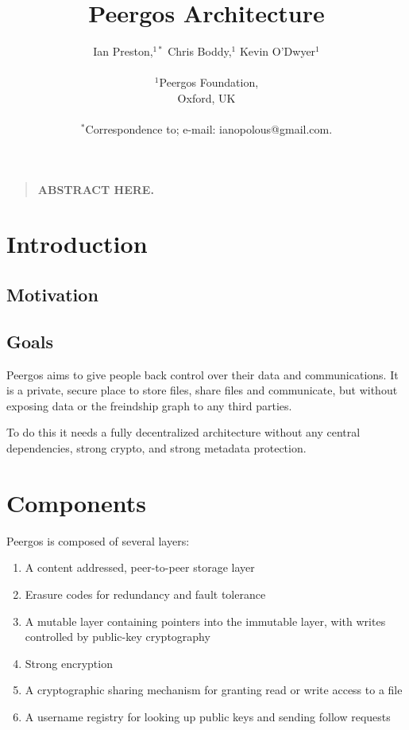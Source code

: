 \documentclass[12pt]{article}
\title{Peergos Architecture}
\author
{Ian Preston,$^{1\ast}$ Chris Boddy,$^{1}$ Kevin O'Dwyer$^{1}$\\
\\
\normalsize{$^{1}$Peergos Foundation,}\\
\normalsize{Oxford, UK}\\
\\
\normalsize{$^\ast$Correspondence to; e-mail:  ianopolous@gmail.com.}
}
\date{}
\newenvironment{sciabstract}{%
\begin{quote} \bf}
{\end{quote}}
\begin{document}
 


\baselineskip24pt


\maketitle 




\begin{sciabstract}
        ABSTRACT  HERE.
\end{sciabstract}


\section*{Introduction}

\subsection*{Motivation}


\subsection*{Goals}
Peergos aims to give people back control over their data and communications. It is a private, secure place to store files, share files and communicate, but without exposing data or the freindship graph to any third parties. 

To do this it needs a fully decentralized architecture without any central dependencies, strong crypto, and strong metadata protection. 

\section*{Components}
Peergos is composed of several layers:

\begin{enumerate}
\item A content addressed, peer-to-peer storage layer
\item Erasure codes for redundancy and fault tolerance
\item A mutable layer containing pointers into the immutable layer, with writes controlled by public-key cryptography
\item Strong encryption
\item A cryptographic sharing mechanism for granting read or write access to a file
\item A username registry for looking up public keys and sending follow requests
\end{enumerate}
\end{document}
